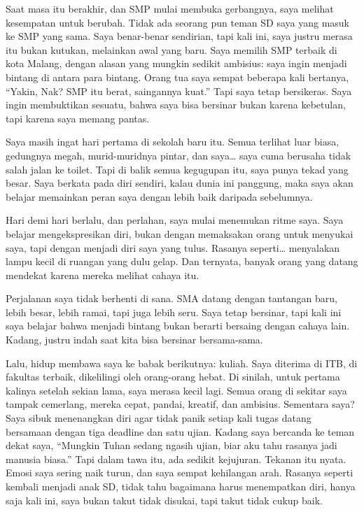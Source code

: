 \documentclass[
  letterpaper,
  DIV=11,
  numbers=noendperiod]{scrreprt}
\begin{document}
Saat masa itu berakhir, dan SMP mulai membuka gerbangnya, saya melihat
kesempatan untuk berubah. Tidak ada seorang pun teman SD saya yang masuk
ke SMP yang sama. Saya benar-benar sendirian, tapi kali ini, saya justru
merasa itu bukan kutukan, melainkan awal yang baru. Saya memilih SMP
terbaik di kota Malang, dengan alasan yang mungkin sedikit ambisius:
saya ingin menjadi bintang di antara para bintang. Orang tua saya sempat
beberapa kali bertanya, ``Yakin, Nak? SMP itu berat, saingannya kuat.''
Tapi saya tetap bersikeras. Saya ingin membuktikan sesuatu, bahwa saya
bisa bersinar bukan karena kebetulan, tapi karena saya memang pantas.

Saya masih ingat hari pertama di sekolah baru itu. Semua terlihat luar
biasa, gedungnya megah, murid-muridnya pintar, dan saya\ldots{} saya
cuma berusaha tidak salah jalan ke toilet. Tapi di balik semua kegugupan
itu, saya punya tekad yang besar. Saya berkata pada diri sendiri, kalau
dunia ini panggung, maka saya akan belajar memainkan peran saya dengan
lebih baik daripada sebelumnya.

Hari demi hari berlalu, dan perlahan, saya mulai menemukan ritme saya.
Saya belajar mengekspresikan diri, bukan dengan memaksakan orang untuk
menyukai saya, tapi dengan menjadi diri saya yang tulus. Rasanya
seperti\ldots{} menyalakan lampu kecil di ruangan yang dulu gelap. Dan
ternyata, banyak orang yang datang mendekat karena mereka melihat cahaya
itu.

Perjalanan saya tidak berhenti di sana. SMA datang dengan tantangan
baru, lebih besar, lebih ramai, tapi juga lebih seru. Saya tetap
bersinar, tapi kali ini saya belajar bahwa menjadi bintang bukan berarti
bersaing dengan cahaya lain. Kadang, justru indah saat kita bisa
bersinar bersama-sama.

Lalu, hidup membawa saya ke babak berikutnya: kuliah. Saya diterima di
ITB, di fakultas terbaik, dikelilingi oleh orang-orang hebat. Di
sinilah, untuk pertama kalinya setelah sekian lama, saya merasa kecil
lagi. Semua orang di sekitar saya tampak cemerlang, mereka cepat,
pandai, kreatif, dan ambisius. Sementara saya? Saya sibuk menenangkan
diri agar tidak panik setiap kali tugas datang bersamaan dengan tiga
deadline dan satu ujian. Kadang saya bercanda ke teman dekat saya,
``Mungkin Tuhan sedang ngasih ujian, biar aku tahu rasanya jadi manusia
biasa.'' Tapi dalam tawa itu, ada sedikit kejujuran. Tekanan itu nyata.
Emosi saya sering naik turun, dan saya sempat kehilangan arah. Rasanya
seperti kembali menjadi anak SD, tidak tahu bagaimana harus menempatkan
diri, hanya saja kali ini, saya bukan takut tidak disukai, tapi takut
tidak cukup baik.
\end{document}
